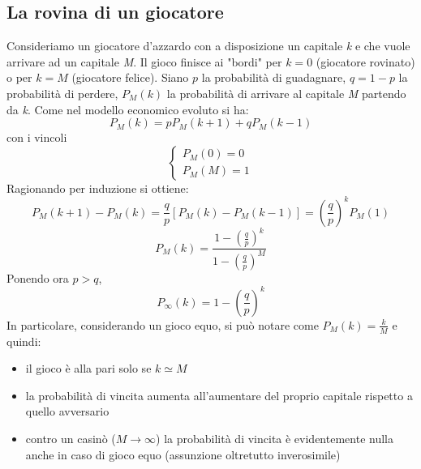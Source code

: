 \documentclass[12pt, a4paper]{article}
\theoremstyle{theorem}
\begin{document}
		\subsection{La rovina di un giocatore}
			Consideriamo un giocatore d'azzardo con a disposizione un capitale \textit{k} e che vuole arrivare ad un capitale \textit{M}.
			Il gioco finisce ai "bordi" per $k=0$ (giocatore rovinato) o per $k=M$ (giocatore felice).
			Siano $p$ la probabilità di guadagnare, $q=1-p$ la probabilità di perdere, $P_M(k)$ la probabilità di arrivare al capitale \textit{M} partendo da \textit{k}.
			Come nel modello economico evoluto si ha:
			\begin{equation}
				P_M(k)=pP_M(k+1)+qP_M(k-1)
			\end{equation}
			con i vincoli
			\begin{equation}
				\begin{cases}
					P_M(0)=0\\
					P_M(M)=1
				\end{cases}
			\end{equation}
			Ragionando per induzione si ottiene:
			\begin{equation}
				P_M(k+1)-P_M(k)=\frac{q}{p}\left[P_M(k)-P_M(k-1)\right]=\left(\frac{q}{p}\right)^kP_M(1)
			\end{equation}
			\begin{equation}
				P_M(k)=\frac{1-\left(\frac{q}{p}\right)^k}{1-\left(\frac{q}{p}\right)^M}
			\end{equation}
			Ponendo ora $p>q$,
			\begin{equation}
				P_\infty(k)=1-\left(\frac{q}{p}\right)^k
			\end{equation}
			In particolare, considerando un gioco equo, si può notare come $P_M(k)=\frac{k}{M}$ e quindi:
			\begin{itemize}
				\item il gioco è alla pari solo se $k\simeq M$
				\item la probabilità di vincita aumenta all'aumentare del proprio capitale rispetto a quello avversario
				\item contro un casinò ($M\to\infty$) la probabilità di vincita è evidentemente nulla anche in caso di gioco equo (assunzione oltretutto inverosimile)
			\end{itemize}
\end{document}
